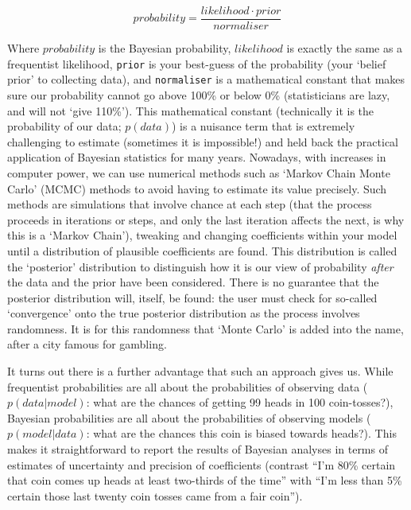 \documentclass[11pt]{article}
\begin{document}
{\begin{equation}
  probability = \frac{likelihood \cdot prior}{normaliser}
  \label{bayes_theorem}
\end{equation}

Where $probability$ is the Bayesian probability, $likelihood$ is exactly the same as a frequentist likelihood, \texttt{prior} is your best-guess of the probability (your `belief prior' to collecting data), and \texttt{normaliser} is a mathematical constant that makes sure our probability cannot go above 100\% or below 0\% (statisticians are lazy, and will not `give 110\%'). This mathematical constant (technically it is the probability of our data; $p(data)$) is a nuisance term that is extremely challenging to estimate (sometimes it is impossible!) and held back the practical application of Bayesian statistics for many years. Nowadays, with increases in computer power, we can use numerical methods such as `Markov Chain Monte Carlo' (MCMC) methods to avoid having to estimate its value precisely. Such methods are simulations  that involve chance at each step (that the process proceeds in iterations or steps, and only the last iteration affects the next, is why this is a `Markov Chain'), tweaking and changing coefficients within your model until a distribution of plausible coefficients are found. This distribution is called the `posterior' distribution to distinguish how it is our view of probability \emph{after} the data and the prior have been considered. There is no guarantee that the posterior distribution will, itself, be found: the user must check for so-called `convergence' onto the true posterior distribution as the process involves randomness. It is for this randomness that `Monte Carlo' is added into the name, after a city famous for gambling.

It turns out there is a further advantage that such an approach gives us. While frequentist probabilities are all about the probabilities of observing data ($p(data|model)$: what are the chances of getting 99 heads in 100 coin-tosses?), Bayesian probabilities are all about the probabilities of observing models ($p(model|data)$: what are the chances this coin is biased towards heads?). This makes it straightforward to report the results of Bayesian analyses in terms of estimates of uncertainty and precision of coefficients (contrast ``I'm 80\% certain that coin comes up heads at least two-thirds of the time'' with ``I'm less than 5\% certain those last twenty coin tosses came from a fair coin'').


}
\end{document}

